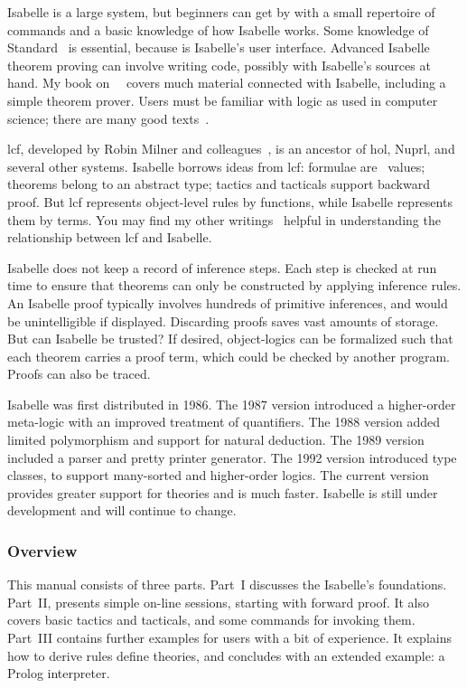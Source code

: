 Isabelle is a large system, but beginners can get by with a small
repertoire of commands and a basic knowledge of how Isabelle works.  Some
knowledge of Standard~\ML{} is essential, because \ML{} is Isabelle's user
interface.  Advanced Isabelle theorem proving can involve writing \ML{}
code, possibly with Isabelle's sources at hand.  My book
on~\ML{}~\cite{paulson91} covers much material connected with Isabelle,
including a simple theorem prover.  Users must be familiar with logic as
used in computer science; there are many good
texts~\cite{galton90,reeves90}.

{\sc lcf}, developed by Robin Milner and colleagues~\cite{gordon79}, is an
ancestor of {\sc hol}, Nuprl, and several other systems.  Isabelle borrows
ideas from {\sc lcf}: formulae are~\ML{} values; theorems belong to an
abstract type; tactics and tacticals support backward proof.  But {\sc lcf}
represents object-level rules by functions, while Isabelle represents them
by terms.  You may find my other writings~\cite{paulson87,paulson-handbook}
helpful in understanding the relationship between {\sc lcf} and Isabelle.

Isabelle does not keep a record of inference steps.  Each step is checked
at run time to ensure that theorems can only be constructed by applying
inference rules.  An Isabelle proof typically involves hundreds of
primitive inferences, and would be unintelligible if displayed.
Discarding proofs saves vast amounts of storage.  But can Isabelle be
trusted?  If desired, object-logics can be formalized such that each
theorem carries a proof term, which could be checked by another program.
Proofs can also be traced.

 Isabelle was first distributed in 1986.
The 1987 version introduced a higher-order meta-logic with an improved
treatment of quantifiers.  The 1988 version added limited polymorphism and
support for natural deduction.  The 1989 version included a parser and
pretty printer generator.  The 1992 version introduced type classes, to
support many-sorted and higher-order logics.  The current version provides
greater support for theories and is much faster.  Isabelle is still under
development and will continue to change.

\subsubsection*{Overview} 
This manual consists of three parts.  Part~I discusses the Isabelle's
foundations.  Part~II, presents simple on-line sessions, starting with
forward proof.  It also covers basic tactics and tacticals, and some
commands for invoking them.  Part~III contains further examples for users
with a bit of experience.  It explains how to derive rules define theories,
and concludes with an extended example: a Prolog interpreter.

